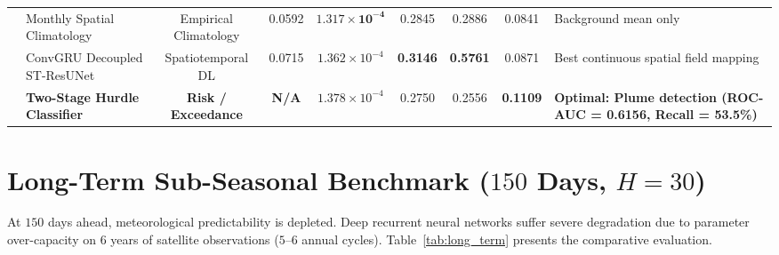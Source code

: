 ﻿\documentclass[10pt,a4paper]{article}
\begin{document}
\begin{table}[htbp]
\begin{tabularx}{\textwidth}{llccccccX}
& Monthly Spatial Climatology & Empirical Climatology & 0.0592 & $\mathbf{1.317 \times 10^{-4}}$ & 0.2845 & 0.2886 & 0.0841 & Background mean only \\
& ConvGRU Decoupled ST-ResUNet & Spatiotemporal DL & 0.0715 & $1.362 \times 10^{-4}$ & \textbf{0.3146} & \textbf{0.5761} & 0.0871 & Best continuous spatial field mapping \\
& \textbf{Two-Stage Hurdle Classifier} & \textbf{Risk / Exceedance} & \textbf{N/A} & $1.378 \times 10^{-4}$ & 0.2750 & 0.2556 & \textbf{0.1109} & \textbf{Optimal: Plume detection (ROC-AUC = 0.6156, Recall = 53.5\%)} \\
\bottomrule
\end{tabularx}
\end{table}

\vspace{0.8em}
\section{Long-Term Sub-Seasonal Benchmark ($150$ Days, $H=30$)}
At $150$ days ahead, meteorological predictability is depleted. Deep recurrent neural networks suffer severe degradation due to parameter over-capacity on $6$ years of satellite observations ($5$--$6$ annual cycles). Table~\ref{tab:long_term} presents the comparative evaluation.
\end{document}
